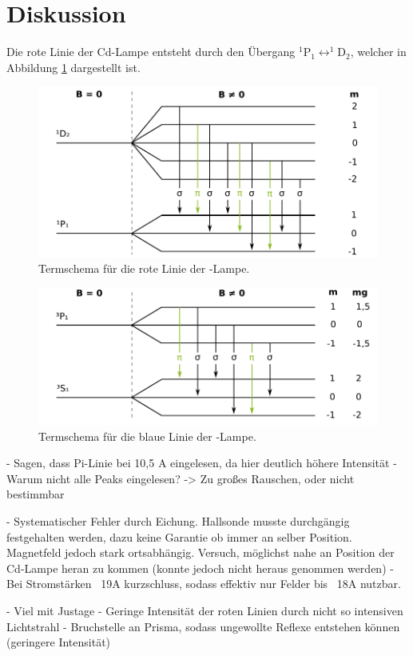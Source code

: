 \section{Diskussion}
\label{sec:Diskussion}

Die rote Linie der Cd-Lampe entsteht durch den Übergang
$^1\mathrm{P}_1 \leftrightarrow ^1\mathrm{D}_2$,
welcher in Abbildung \ref{fig:termschema-rot} dargestellt ist.

\begin{figure}
	\centering
	\includegraphics{images/termschema-rot.pdf}
	\caption{Termschema für die rote Linie der -Lampe.}
	\label{fig:termschema-rot}
\end{figure}

\begin{figure}
	\centering
	\includegraphics{images/termschema-blau.pdf}
	\caption{Termschema für die blaue Linie der -Lampe.}
	\label{fig:termschema-blau}
\end{figure}

- Sagen, dass Pi-Linie bei 10,5 A eingelesen, da hier deutlich höhere Intensität
- Warum nicht alle Peaks eingelesen? -> Zu großes Rauschen, oder nicht bestimmbar

- Systematischer Fehler durch Eichung. Hallsonde musste durchgängig festgehalten werden,
dazu keine Garantie ob immer an selber Position. Magnetfeld jedoch stark ortsabhängig.
Versuch, möglichst nahe an Position der Cd-Lampe heran zu kommen (konnte jedoch nicht heraus genommen werden)
- Bei Stromstärken ~19A kurzschluss, sodass effektiv nur Felder bis ~18A nutzbar.

- Viel mit Justage
- Geringe Intensität der roten Linien durch nicht so intensiven Lichtstrahl
- Bruchstelle an Prisma, sodass ungewollte Reflexe entstehen können (geringere Intensität)

